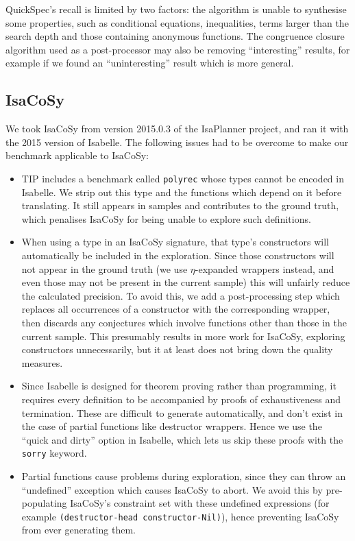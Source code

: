 QuickSpec's recall is limited by two factors: the algorithm is unable to
synthesise some properties, such as conditional equations, inequalities, terms
larger than the search depth and those containing anonymous functions. The
congruence closure algorithm used as a post-processor may also be removing
``interesting'' results, for example if we found an ``uninteresting'' result
which is more general.

\subsection{IsaCoSy}

We took IsaCoSy from version 2015.0.3 of the IsaPlanner project, and ran it
with the 2015 version of Isabelle. The following issues had to be overcome to
make our benchmark applicable to IsaCoSy:

\begin{itemize}
\item TIP includes a benchmark called \texttt{polyrec} whose types cannot be
  encoded in Isabelle. We strip out this type and the functions which depend on
  it before translating. It still appears in samples and contributes to the
  ground truth, which penalises IsaCoSy for being unable to explore such
  definitions.
\item When using a type in an IsaCoSy signature, that type's constructors will
  automatically be included in the exploration. Since those constructors will
  not appear in the ground truth (we use $\eta$-expanded wrappers instead, and
  even those may not be present in the current sample) this will unfairly reduce
  the calculated precision. To avoid this, we add a post-processing step which
  replaces all occurrences of a constructor with the corresponding wrapper, then
  discards any conjectures which involve functions other than those in the
  current sample. This presumably results in more work for IsaCoSy, exploring
  constructors unnecessarily, but it at least does not bring down the quality
  measures.
\item Since Isabelle is designed for theorem proving rather than programming, it
  requires every definition to be accompanied by proofs of exhaustiveness and
  termination. These are difficult to generate automatically, and don't exist in
  the case of partial functions like destructor wrappers. Hence we use the
  ``quick and dirty'' option in Isabelle, which lets us skip these proofs with
  the \texttt{sorry} keyword.
\item Partial functions cause problems during exploration, since they can throw
  an ``undefined'' exception which causes IsaCoSy to abort. We avoid this by
  pre-populating IsaCoSy's constraint set with these undefined expressions
  (for example \texttt{(destructor-head constructor-Nil)}), hence preventing
  IsaCoSy from ever generating them.
\end{itemize}

